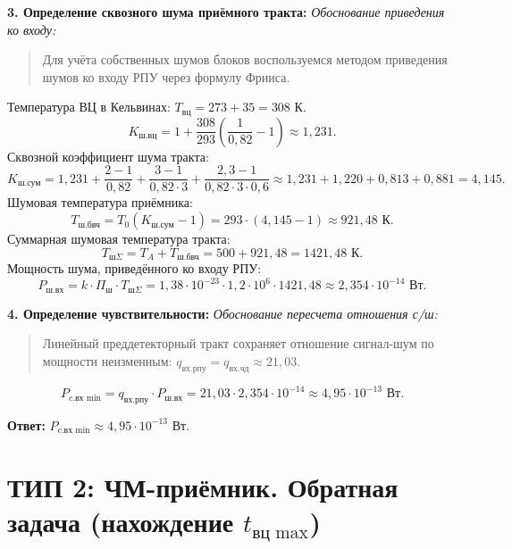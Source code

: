 \documentclass[12pt,a4paper]{article}
\begin{document}
\textbf{3. Определение сквозного шума приёмного тракта:}
\textit{Обоснование приведения ко входу:}
\begin{quote}
Для учёта собственных шумов блоков воспользуемся методом приведения шумов ко входу РПУ через формулу Фрииса.
\end{quote}
Температура ВЦ в Кельвинах: $T_{\text{вц}} = 273 + 35 = 308\text{ К}$.
\begin{equation}
K_{\text{ш.вц}} = 1 + \frac{308}{293} \left( \frac{1}{0{,}82} - 1 \right) \approx 1{,}231.
\end{equation}
Сквозной коэффициент шума тракта:
\begin{equation}
K_{\text{ш.сум}} = 1{,}231 + \frac{2 - 1}{0{,}82} + \frac{3 - 1}{0{,}82 \cdot 3} + \frac{2{,}3 - 1}{0{,}82 \cdot 3 \cdot 0{,}6} \approx 1{,}231 + 1{,}220 + 0{,}813 + 0{,}881 = 4{,}145.
\end{equation}
Шумовая температура приёмника:
\begin{equation}
T_{\text{ш.бвч}} = T_0 (K_{\text{ш.сум}} - 1) = 293 \cdot (4{,}145 - 1) \approx 921{,}48\text{ К}.
\end{equation}
Суммарная шумовая температура тракта:
\begin{equation}
T_{\text{ш}\Sigma} = T_A + T_{\text{ш.бвч}} = 500 + 921{,}48 = 1421{,}48\text{ К}.
\end{equation}
Мощность шума, приведённого ко входу РПУ:
\begin{equation}
P_{\text{ш.вх}} = k \cdot \Pi_{\text{ш}} \cdot T_{\text{ш}\Sigma} = 1{,}38 \cdot 10^{-23} \cdot 1{,}2 \cdot 10^6 \cdot 1421{,}48 \approx 2{,}354 \cdot 10^{-14}\text{ Вт}.
\end{equation}

\textbf{4. Определение чувствительности:}
\textit{Обоснование пересчета отношения с/ш:}
\begin{quote}
Линейный преддетекторный тракт сохраняет отношение сигнал-шум по мощности неизменным: $q_{\text{вх.рпу}} = q_{\text{вх.чд}} \approx 21{,}03$.
\end{quote}
\begin{equation}
P_{c.\text{вх min}} = q_{\text{вх.рпу}} \cdot P_{\text{ш.вх}} = 21{,}03 \cdot 2{,}354 \cdot 10^{-14} \approx 4{,}95 \cdot 10^{-13}\text{ Вт}.
\end{equation}

\textbf{Ответ:} $P_{c.\text{вх min}} \approx 4{,}95 \cdot 10^{-13}\text{ Вт}$.

\newpage
\section{ТИП 2: ЧМ-приёмник. Обратная задача (нахождение $t_{\text{вц max}}$)}
\end{document}

